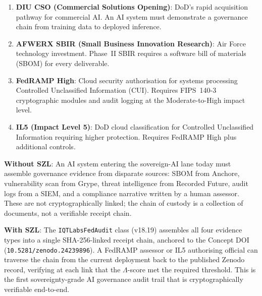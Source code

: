 \begin{enumerate}
  \item \textbf{DIU CSO (Commercial Solutions Opening)}: DoD's rapid
    acquisition pathway for commercial AI.  An AI system must demonstrate
    a governance chain from training data to deployed inference.
  \item \textbf{AFWERX SBIR (Small Business Innovation Research)}: Air Force
    technology investment.  Phase~II SBIR requires a software bill of
    materials (SBOM) for every deliverable.
  \item \textbf{FedRAMP High}: Cloud security authorisation for systems
    processing Controlled Unclassified Information (CUI).  Requires FIPS~140-3
    cryptographic modules and audit logging at the Moderate-to-High impact level.
  \item \textbf{IL5 (Impact Level 5)}: DoD cloud classification for Controlled
    Unclassified Information requiring higher protection.  Requires FedRAMP
    High plus additional controls.
\end{enumerate}

\textbf{Without SZL}: An AI system entering the sovereign-AI lane today must
assemble governance evidence from disparate sources: SBOM from Anchore,
vulnerability scan from Grype, threat intelligence from Recorded Future,
audit logs from a SIEM, and a compliance narrative written by a human
assessor.  These are not cryptographically linked; the chain of custody is
a collection of documents, not a verifiable receipt chain.

\textbf{With SZL}: The \texttt{IQTLabsFedAudit} class (v18.19) assembles
all four evidence types into a single SHA-256-linked receipt chain, anchored
to the Concept DOI (\texttt{10.5281/zenodo.24239896}).  A FedRAMP assessor
or IL5 authorising official can traverse the chain from the current deployment
back to the published Zenodo record, verifying at each link that the
$\Lambda$-score met the required threshold.  This is the first sovereignty-grade
AI governance audit trail that is cryptographically verifiable end-to-end.

